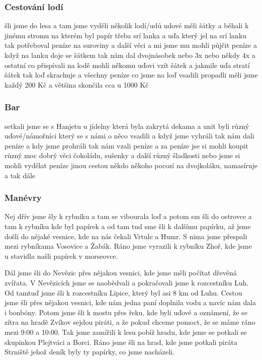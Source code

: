 
\subsubsection{Cestování lodí} %
\label{ssub:cestování_lodí}

šli jsme do lesa a tam jsme vyděli několik lodí/udů udové měli šátky a běhali k jinému stromu na kterém byl papír třeba srí lanka a uďa který jel na srí lanku tak potřeboval peníze na suroviny a další věci a mi jsme mu mohli půjčit peníze a když na lanku doje se šátkem tak nám dal dvojnásobek nebo 3x nebo někdy 4x a ostatní co přispívali na lodě mohli někomu uďovi vzít šátek a jakmile uďa stratí šátek tak loď skrachuje a všechny peníze co jsme na loď vsadili propadli měli jsme každý 200 Kč a většina skončila cca u 1000 Kč


\subsubsection{Bar} %
\label{ssub:bar}
setkali jsme se s Hanjetu u jídelny která byla zakrytá dekama a unit byli různý uďové/námořníci který se s námi o něco vsadili a když jsme vyhráli tak nám dali peníze a kdy jsme prohráli tak nám vzali peníze a za peníze jse si mohli koupit různý moc dobrý věci čokoládu, sušenky a další různý šladkosti nebo jsme si mohli vydělat peníze jinou cestou někdo někoho pocozí na dvojkoláku, namasíruje a tak dále


\subsubsection{Manévry} %
\label{ssub:manévry}

Nej dřív jsme šly k rybníku a tam se vibourala loď a potom sm šli do ostrovce a tam k rybníku kde byl papírek a od tam tud sme šli k dalšímu papírku, až jsme došli do nějaké vesnice, kde na nás čekali Vrtule a Humr. S nima jsme přespali mezi rybníkama Vosovice a Žabák. Ráno jsme vyrazili k rybníku Zhoř, kde jsme u stavidla našli papírek v morseovce.

Dál jsme šli do Nevězic přes nějakou vesnici, kde jsme měli počítat dřevěná zvířata. V Nevězicích jsme se naobědvali a pokračovali jsme k rozcestníku Luh. Od tamtuď jsme šli k rozcestníku Lipice, který byl asi 8 km od Luhu. Cestou jsme šli přes nějakou vesnici, kde nám jedna paní doplnila vodu a navíc nám dala i bonbóny. Potom jsme šli k mostu přes řeku, kde byli uďové a oznámení, že se zítra na hradě Zvíkov sejdou piráti, a že pokud chceme pomoct, že se máme ráno mezi 9:00 a 10:00. Tak jsme zamířili k lesu pobíž hradu, kde jsme se potkali se skupinkou Plejtváci a Borci. Ráno jsme šli na hrad, kde jsme potkali piráta Strniště jehož deník byly ty papírky, co jsme nacházeli.

